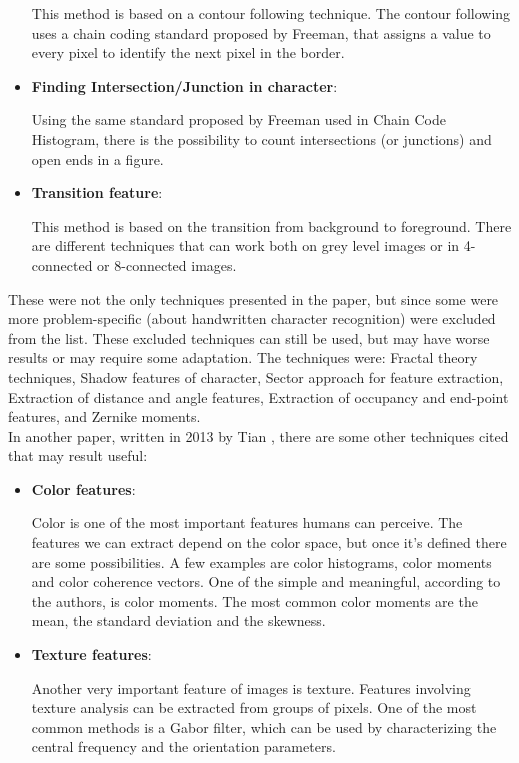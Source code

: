 \documentclass[conference]{IEEEtran}
\begin{document}
\begin{itemize}
						This method is based on a contour following technique. 
						The contour following uses a chain coding standard proposed by Freeman, that assigns a value to every pixel to identify the next pixel in the border.

					\item \textbf{Finding Intersection/Junction in character}:
					
						Using the same standard proposed by Freeman used in Chain Code Histogram, there is the possibility to count intersections (or junctions) and open ends in a figure.					
						
					\item \textbf{Transition feature}:
					
						This method is based on the transition from background to foreground. 
						There are different techniques that can work both on grey level images or in 4-connected or 8-connected images.
					
				\end{itemize}
			
			
			\noindent These were not the only techniques presented in the paper, but since some were more problem-specific (about handwritten character recognition)
			were excluded from the list. These excluded techniques can still be used, but may have worse results or may require some adaptation. 
			The techniques were: Fractal theory techniques, Shadow features of character, Sector approach for feature extraction, 
			Extraction of distance and angle features, Extraction of occupancy and end-point features, and Zernike moments.\\
			In another paper, written in 2013 by Tian \cite{3}, there are some other techniques cited that may result useful:
			
			\begin{itemize}
			
				\item \textbf{Color features}:
					
					Color is one of the most important features humans can perceive. 
					The features we can extract depend on the color space, but once it's defined there are some possibilities. 
					A few examples are color histograms, color moments and color coherence vectors. 
					One of the simple and meaningful, according to the authors, is color moments. 
					The most common color moments are the mean, the standard deviation and the skewness. 
					
				\item \textbf{Texture features}:
				
					Another very important feature of images is texture. 
					Features involving texture analysis can be extracted from groups of pixels. 
					One of the most common methods is a Gabor filter, which can be used by characterizing the central frequency and the orientation parameters.
			
			\end{itemize}
			
\end{document}
